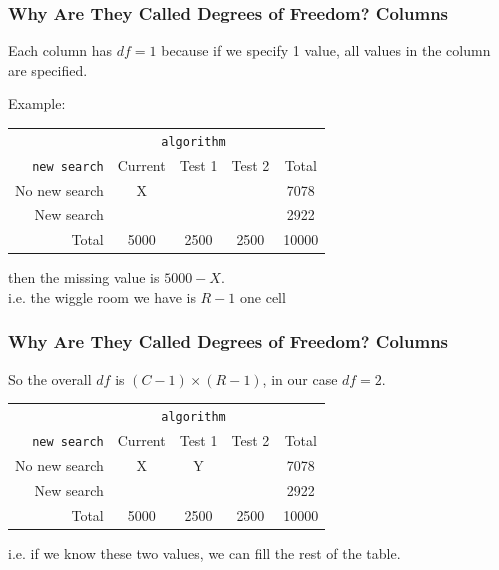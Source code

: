 \documentclass[handout]{beamer}
\newcommand{\blue}[1]{\textcolor{blue2}{#1}}
\begin{document}
\begin{frame}
\frametitle{Why Are They Called Degrees of Freedom? Columns}

Each column has $df=1$ because if we specify 1 value, all values in the column are specified.  

\vspace{0.5cm}

\pause Example:
\begin{center}
  \begin{tabular}{r|ccc|c}
& \multicolumn{3}{c|}{{\tt algorithm}} & \\
       {\tt new search} & Current & Test 1 & Test 2 & Total \\ 
\hline
    No new search & X &  &  & 7078 \\ 
    New search &  &  &  & 2922 \\ 
\hline
    Total & 5000 & 2500 & 2500 & 10000 \\ 
  \end{tabular}
\end{center}
\pause
then the missing value is $5000-X$.\\ 
i.e. the \blue{wiggle room} we have is $R-1$ one cell

\end{frame}


\begin{frame}
\frametitle{Why Are They Called Degrees of Freedom? Columns}

So the overall $df$ is $(C-1)\times(R-1)$, in our case $df=2$.

\vspace{0.5cm}

\begin{center}
  \begin{tabular}{r|ccc|c}
& \multicolumn{3}{c|}{{\tt algorithm}} & \\
       {\tt new search} & Current & Test 1 & Test 2 & Total \\ 
\hline
    No new search & X & Y &  & 7078 \\ 
    New search &  &  &  & 2922 \\ 
\hline
    Total & 5000 & 2500 & 2500 & 10000 \\ 
  \end{tabular}
\end{center}
\pause
i.e. if we know these two values, we can fill the rest of the table.

\end{frame}
\end{document}
